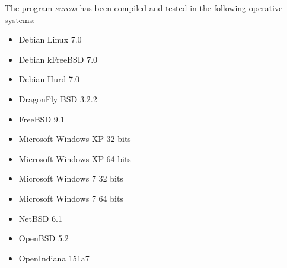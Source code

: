 The program \emph{surcos} has been compiled and tested in the following
operative systems:
\begin{itemize}
\item Debian Linux 7.0
\item Debian kFreeBSD 7.0
\item Debian Hurd 7.0
\item DragonFly BSD 3.2.2
\item FreeBSD 9.1
\item Microsoft Windows XP 32 bits
\item Microsoft Windows XP 64 bits
\item Microsoft Windows 7 32 bits
\item Microsoft Windows 7 64 bits
\item NetBSD 6.1
\item OpenBSD 5.2
\item OpenIndiana 151a7
\end{itemize}
